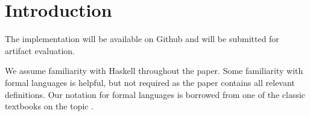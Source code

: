 \section{Introduction}

\TODO{}

The implementation will be available on Github and will be submitted for artifact evaluation. 


We assume familiarity with Haskell throughout the paper.  Some
familiarity with formal languages is helpful, but not required as the
paper contains all relevant definitions. Our notation for formal
languages is borrowed from one of the classic textbooks on the topic
\cite{DBLP:books/daglib/0011126}.


